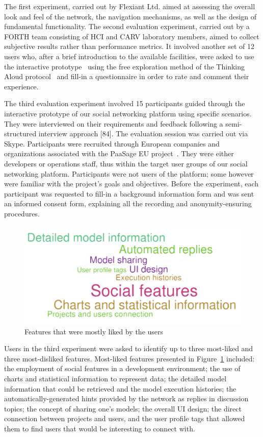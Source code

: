 The first experiment, carried out by Flexiant Ltd. aimed at assessing the overall look and feel of the network, the navigation mechanisms, as well as the design of fundamental functionality.
The second evaluation experiment, carried out by a FORTH team consisting of HCI and CARV laboratory members, aimed to collect subjective results rather than performance metrics. It involved another set of 12 users who, after a brief introduction to the available facilities, were asked to use the interactive prototype~\cite{Virzi1996} using the free exploration method of the Thinking Aloud protocol~\cite{jordan1998introduction} and fill-in a questionnaire in order to rate and comment their experience. 

The third evaluation experiment involved 15 participants guided through the interactive prototype of our social networking platform using specific scenarios. They were interviewed on their requirements and feedback following a semi-structured interview approach [84]. The evaluation session was carried out via Skype. Participants were recruited through European companies and organizations associated with the PaaSage EU project~\cite{paasage}. They were either developers or operations staff, thus within the target user groups of our social networking platform. Participants were not users of the  platform; some however were familiar with the project’s goals and objectives. Before the experiment, each participant was requested to fill-in a background information form and was sent an informed consent form, explaining all the recording and anonymity-ensuring procedures. 

\begin{figure}[h]
	\centering
	\includegraphics[width=1\textwidth,natwidth=200,natheight=150]{./fig/most-liked.pdf}
	\caption{Features that were mostly liked by the users}
	\label{fig:most-liked}
\end{figure}

Users in the third experiment were asked to identify up to three most-liked and three most-disliked features. Most-liked features presented in Figure~\ref{fig:most-liked} included: the employment of social features in a development environment; the use of charts and statistical information to represent data; the detailed model information that could be retrieved and the model execution histories; the automatically-generated hints provided by the network as replies in discussion topics; the concept of sharing one’s models; the overall UI design; the direct connection between projects and users, and the user profile tags that allowed them to find users that would be interesting to connect with.

